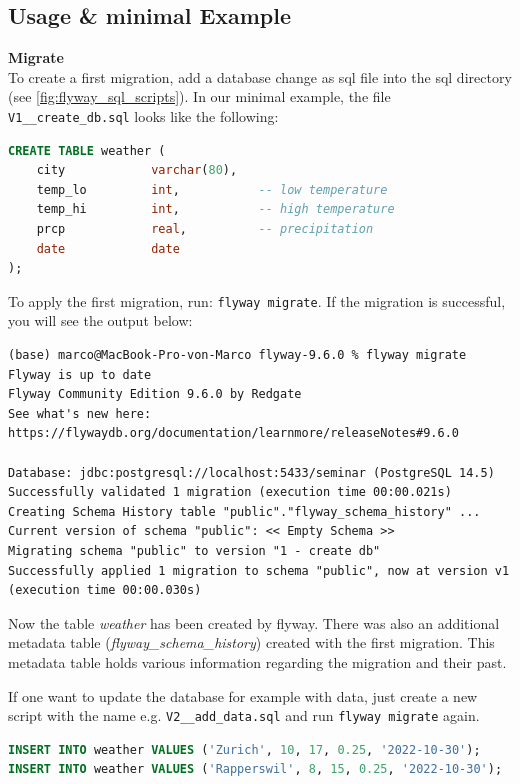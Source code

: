 %


\subsection{Usage \& minimal Example}

%
\textbf{Migrate}\\
To create a first migration, add a database change as sql file into the sql directory (see \autoref{fig:flyway_sql_scripts}).
In our minimal example, the file \texttt{V1\_\_create\_db.sql} looks like the following:

\begin{lstlisting}[language=SQL, caption=Create a database]
CREATE TABLE weather (
	city            varchar(80),
	temp_lo         int,           -- low temperature
	temp_hi         int,           -- high temperature
	prcp            real,          -- precipitation
	date            date
);
\end{lstlisting}

To apply the first migration, run: \texttt{flyway migrate}.
If the migration is successful, you will see the output below:
\begin{lstlisting}[caption=Flyway first migration success]
(base) marco@MacBook-Pro-von-Marco flyway-9.6.0 % flyway migrate
Flyway is up to date
Flyway Community Edition 9.6.0 by Redgate
See what's new here: https://flywaydb.org/documentation/learnmore/releaseNotes#9.6.0

Database: jdbc:postgresql://localhost:5433/seminar (PostgreSQL 14.5)
Successfully validated 1 migration (execution time 00:00.021s)
Creating Schema History table "public"."flyway_schema_history" ...
Current version of schema "public": << Empty Schema >>
Migrating schema "public" to version "1 - create db"
Successfully applied 1 migration to schema "public", now at version v1 (execution time 00:00.030s)
\end{lstlisting}

Now the table \textit{weather} has been created by flyway. There was also an additional metadata table (\textit{flyway\_schema\_history}) created with the first migration. This metadata table holds various information regarding the migration and their past.

If one want to update the database for example with data, just create a new script with the name e.g. \texttt{V2\_\_add\_data.sql} and run  \texttt{flyway migrate} again.

\begin{lstlisting}[language=SQL, caption=Create a database]
INSERT INTO weather VALUES ('Zurich', 10, 17, 0.25, '2022-10-30');
INSERT INTO weather VALUES ('Rapperswil', 8, 15, 0.25, '2022-10-30');
\end{lstlisting}

